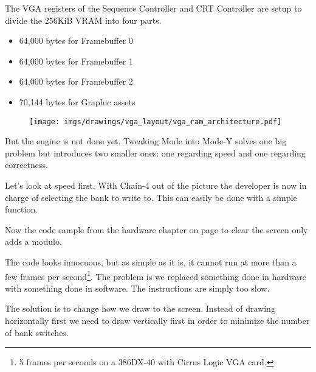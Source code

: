 \documentclass[book.tex]{subfiles}
\begin{document}
 \par
 The VGA registers of the Sequence Controller and CRT Controller are setup to divide the 256KiB VRAM into four parts.
 \begin{itemize}\label{SetupPages}
 \item 64,000 bytes for Framebuffer 0
 \item 64,000 bytes for Framebuffer 1
 \item 64,000 bytes for Framebuffer 2
 \item 70,144 bytes for Graphic assets
\end{itemize}
\par
\begin{figure}[H]
\centering
 \texttt{[image: imgs/drawings/vga\_layout/vga\_ram\_architecture.pdf]}
 \end{figure}
\par
But the engine is not done yet. Tweaking Mode  into Mode-Y solves one big problem but introduces two smaller ones: one regarding speed and one regarding correctness.\\
\par
Let's look at speed first. With Chain-4 out of the picture the developer is now in charge of selecting the bank to write to. This can easily be done with a simple function.\\
\par
 \par
 \begin{minipage}{\textwidth}

\end{minipage}
 \par

Now the code sample from the hardware chapter on page \pageref{clearvga} to clear the screen only adds a modulo.\\
\par
\par
\begin{minipage}{\textwidth}

\end{minipage}
\par
The code looks innocuous, but as simple as it is, it cannot run at more than a few frames per second\footnote{5 frames per seconds on a 386DX-40 with Cirrus Logic VGA card.}. The problem is we replaced something done in hardware with something done in software. The  instructions are simply too slow.\\
\par
The solution is to change how we draw to the screen. Instead of drawing horizontally first we need to draw vertically first in order to minimize the number of bank switches.\\
\par
\begin{minipage}{\textwidth}

\end{minipage}
\end{document}
